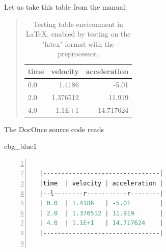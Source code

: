 \n\documentclass[%
oneside,                 %
final,                   %
10pt]{article}
\newenvironment{_cod_tight}[1]{
   \def\FrameCommand{\colorbox{#1}}
   \FrameRule0.6pt\MakeFramed {\FrameRestore}\vskip3mm}
   {\vskip0mm\endMakeFramed}
\newenvironment{cod}[1]{
\bgroup\rmfamily
\fboxsep=0mm\relax
\begin{_cod_tight}{#1}
\list{}{\parsep=-2mm\parskip=0mm\topsep=0pt\leftmargin=2mm
\rightmargin=2\leftmargin\leftmargin=4pt\relax}
\item\relax}
{\endlist\end{_cod_tight}\egroup}
\theoremstyle{definition}
\begin{document}
\begin{enumerate}


Let us take this table from the manual:

\begin{table}
\caption{
Testing table environment in {\LaTeX}, enabled by testing on the "latex" format
with the preprocessor.
\label{mytab}
}


\begin{quote}
\begin{tabular}{lrr}
\hline
\multicolumn{1}{c}{ time } & \multicolumn{1}{c}{ velocity } & \multicolumn{1}{c}{ acceleration } \\
\hline
0.0  & 1.4186   & -5.01        \\
2.0  & 1.376512 & 11.919       \\
4.0  & 1.1E+1   & 14.717624    \\
\hline
\end{tabular}
\end{quote}

\noindent
\end{table}

The DocOnce source code reads










\begin{cod}{cbg_blue1}\begin{lstlisting}[language=Python,style=myspeciallststyle,numbers=left,numberstyle=\tiny,stepnumber=3,numbersep=15pt,xleftmargin=1mm]

  |--------------------------------|
  |time  | velocity | acceleration |
  |--l--------r-----------r--------|
  | 0.0  | 1.4186   | -5.01        |
  | 2.0  | 1.376512 | 11.919       |
  | 4.0  | 1.1E+1   | 14.717624    |
  |--------------------------------|


\end{lstlisting}\end{cod}
\noindent



\end{enumerate}
\end{document}
